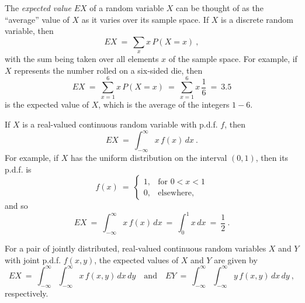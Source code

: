 The \emph{expected value} $EX$ of a random variable $X$ can be thought of as the ``average'' value of $X$ as it varies
over its sample space. If $X$ is a discrete random variable, then
\begin{equation}
 EX ~=~ \sum\limits_{x} x\,P(X=x)~,
\end{equation}
with the sum being taken over all elements $x$ of the sample space. For example, if $X$ represents the number rolled on
a six-sided die, then
\begin{equation}
 EX ~=~ \sum\limits_{x=1}^6 x\,P(X=x) ~=~ \sum\limits_{x=1}^6 x\,\frac{1}{6} ~=~ 3.5
\end{equation}
is the expected value of $X$, which is the average of the integers $1-6$.

If $X$ is a real-valued continuous random variable with p.d.f. $f$, then
\begin{equation}
 EX ~=~ \int_{-\infty}^{\infty} x\,f(x)\,dx ~.
\end{equation}
For example, if $X$ has the uniform distribution on the interval $(0,1)$, then its p.d.f. is
\begin{equation}
 f(x) ~=~ \begin{cases}
  1, &\text{for $0 < x < 1$}\\
   0, &\text{elsewhere,}
 \end{cases}
\end{equation}
and so
\begin{equation}
 EX ~=~ \int_{-\infty}^{\infty} x\,f(x)\,dx ~=~ \int_0^1 x\,dx ~=~ \frac{1}{2} ~.
\end{equation}

For a pair of jointly distributed, real-valued continuous random variables $X$ and $Y$ with joint p.d.f. $f(x,y)$, the
expected values of $X$ and $Y$ are given by
\begin{equation}
 EX ~=~ \int_{-\infty}^{\infty} \int_{-\infty}^{\infty} x\,f(x,y)\,dx\,dy \quad\text{and}\quad
 EY ~=~ \int_{-\infty}^{\infty} \int_{-\infty}^{\infty} y\,f(x,y)\,dx\,dy ~,
\end{equation}
respectively.

